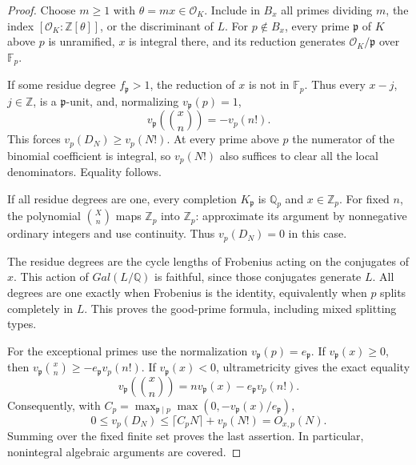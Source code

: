 \documentclass[11pt,a4paper]{article}
\newcommand{\Q}{\mathbb Q}
\newcommand{\Z}{\mathbb Z}
\theoremstyle{definition}
\theoremstyle{remark}
\theoremstyle{plain}
\numberwithin{equation}{section}
\def\operatorname#1{#1}\def\mathrm#1{#1}}
\begin{document}
\begin{proof}
Choose $m\ge1$ with $\theta=mx\in\mathcal O_K$.  Include in $B_x$
all primes dividing $m$, the index $[\mathcal O_K:\Z[\theta]]$, or
the discriminant of $L$.  For $p\notin B_x$, every prime $\mathfrak p$
of $K$ above $p$ is unramified, $x$ is integral there, and its reduction
generates $\mathcal O_K/\mathfrak p$ over $\mathbb F_p$.

If some residue degree $f_{\mathfrak p}>1$, the reduction of $x$ is
not in $\mathbb F_p$.  Thus every $x-j$, $j\in\Z$, is a
$\mathfrak p$-unit, and, normalizing $v_{\mathfrak p}(p)=1$,
\[
 v_{\mathfrak p}\left(\binom{x}{n}\right)=-v_p(n!).
\]
This forces $v_p(D_N)\ge v_p(N!)$.  At every prime above $p$ the
numerator of the binomial coefficient is integral, so $v_p(N!)$ also
suffices to clear all the local denominators.  Equality follows.

If all residue degrees are one, every completion $K_{\mathfrak p}$ is
$\Q_p$ and $x\in\Z_p$.  For fixed $n$, the polynomial
$\binom{X}{n}$ maps $\Z_p$ into $\Z_p$: approximate its argument
by nonnegative ordinary integers and use continuity.  Thus
$v_p(D_N)=0$ in this case.

The residue degrees are the cycle lengths of Frobenius acting on the
conjugates of $x$.  This action of $\operatorname{Gal}(L/\Q)$ is
faithful, since those conjugates generate $L$.  All degrees are one
exactly when Frobenius is the identity, equivalently when $p$ splits
completely in $L$.  This proves the good-prime formula, including
mixed splitting types.

For the exceptional primes use the normalization
$v_{\mathfrak p}(p)=e_{\mathfrak p}$.  If
$v_{\mathfrak p}(x)\ge0$, then
$v_{\mathfrak p}\binom{x}{n}\ge-e_{\mathfrak p}v_p(n!)$.
If $v_{\mathfrak p}(x)<0$, ultrametricity gives the exact equality
\[
 v_{\mathfrak p}\left(\binom{x}{n}\right)
   =n v_{\mathfrak p}(x)-e_{\mathfrak p}v_p(n!).
\]
Consequently, with
$C_p=\max_{\mathfrak p\mid p}\max(0,-v_{\mathfrak p}(x)/e_{\mathfrak p})$,
\[
 0\le v_p(D_N)\le\lceil C_pN\rceil+v_p(N!)=O_{x,p}(N).
\]
Summing over the fixed finite set proves the last assertion.  In
particular, nonintegral algebraic arguments are covered.
\end{proof}
\end{document}
